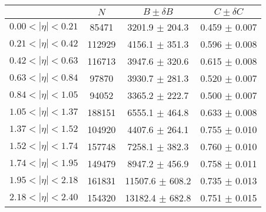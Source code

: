 \begin{tabular}{lccc}
\hline
    &   $N$   & $B \pm \delta B$  &  $C \pm \delta C$ \\
\hline
$0.00 < |\eta| <0.21$          & 85471      & 3201.9     $\pm$ 204.3 & 0.459      $\pm$ 0.007 \\
$0.21 < |\eta| <0.42$          & 112929     & 4156.1     $\pm$ 351.3 & 0.596      $\pm$ 0.008 \\
$0.42 < |\eta| <0.63$          & 116713     & 3947.6     $\pm$ 320.6 & 0.615      $\pm$ 0.008 \\
$0.63 < |\eta| <0.84$          & 97870      & 3930.7     $\pm$ 281.3 & 0.520      $\pm$ 0.007 \\
$0.84 < |\eta| <1.05$          & 94052      & 3365.2     $\pm$ 222.7 & 0.500      $\pm$ 0.007 \\
$1.05 < |\eta| <1.37$          & 188151     & 6555.1     $\pm$ 464.8 & 0.633      $\pm$ 0.008 \\
$1.37 < |\eta| <1.52$          & 104920     & 4407.6     $\pm$ 264.1 & 0.755      $\pm$ 0.010 \\
$1.52 < |\eta| <1.74$          & 157748     & 7258.1     $\pm$ 382.3 & 0.760      $\pm$ 0.010 \\
$1.74 < |\eta| <1.95$          & 149479     & 8947.2     $\pm$ 456.9 & 0.758      $\pm$ 0.011 \\
$1.95 < |\eta| <2.18$          & 161831     & 11507.6    $\pm$ 608.2 & 0.735      $\pm$ 0.013 \\
$2.18 < |\eta| <2.40$          & 154320     & 13182.4    $\pm$ 682.8 & 0.751      $\pm$ 0.015 \\
\hline
\end{tabular}
